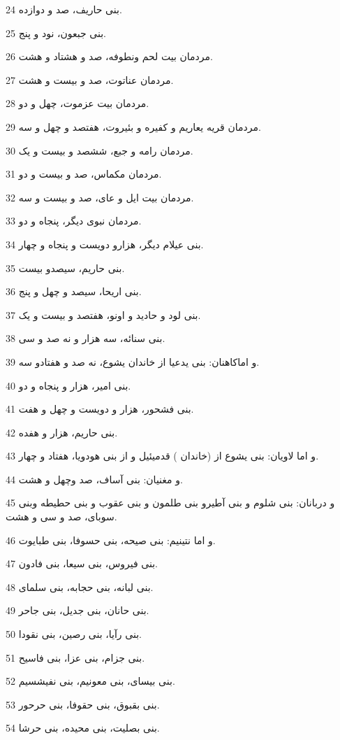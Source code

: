 \par 24 بنی حاریف، صد و دوازده.
\par 25 بنی جبعون، نود و پنج.
\par 26 مردمان بیت لحم ونطوفه، صد و هشتاد و هشت.
\par 27 مردمان عناتوت، صد و بیست و هشت.
\par 28 مردمان بیت عزموت، چهل و دو.
\par 29 مردمان قریه یعاریم و کفیره و بئیروت، هفتصد و چهل و سه.
\par 30 مردمان رامه و جبع، ششصد و بیست و یک.
\par 31 مردمان مکماس، صد و بیست و دو.
\par 32 مردمان بیت ایل و عای، صد و بیست و سه.
\par 33 مردمان نبوی دیگر، پنجاه و دو.
\par 34 بنی عیلام دیگر، هزارو دویست و پنجاه و چهار.
\par 35 بنی حاریم، سیصدو بیست.
\par 36 بنی اریحا، سیصد و چهل و پنج. 
\par 37 بنی لود و حادید و اونو، هفتصد و بیست و یک.
\par 38 بنی سنائه، سه هزار و نه صد و سی.
\par 39 و اماکاهنان: بنی یدعیا از خاندان یشوع، نه صد و هفتادو سه.
\par 40 بنی امیر، هزار و پنجاه و دو.
\par 41 بنی فشحور، هزار و دویست و چهل و هفت.
\par 42 بنی حاریم، هزار و هفده.
\par 43 و اما لاویان: بنی یشوع از (خاندان ) قدمیئیل و از بنی هودویا، هفتاد و چهار.
\par 44 و مغنیان: بنی آساف، صد وچهل و هشت.
\par 45 و دربانان: بنی شلوم و بنی آطیرو بنی طلمون و بنی عقوب و بنی حطیطه وبنی سوبای، صد و سی و هشت.
\par 46 و اما نتینیم: بنی صیحه، بنی حسوفا، بنی طبایوت.
\par 47 بنی فیروس، بنی سیعا، بنی فادون.
\par 48 بنی لبانه، بنی حجابه، بنی سلمای.
\par 49 بنی حانان، بنی جدیل، بنی جاحر.
\par 50 بنی رآیا، بنی رصین، بنی نقودا.
\par 51 بنی جزام، بنی عزا، بنی فاسیح.
\par 52 بنی بیسای، بنی معونیم، بنی نفیشسیم.
\par 53 بنی بقبوق، بنی حقوفا، بنی حرحور.
\par 54 بنی بصلیت، بنی محیده، بنی حرشا.
